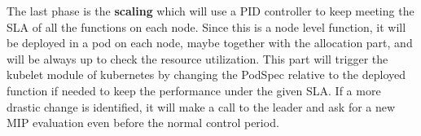 The last phase is the \textbf{scaling} which will use a PID controller to keep meeting the
SLA of all the functions on each node. Since this is a node level function, it will be
deployed in a pod on each node, maybe together with the allocation part, and will be always
up to check the resource utilization. This part will trigger the kubelet module of kubernetes
by changing the PodSpec relative to the deployed function if needed to keep the performance
under the given SLA. If a more drastic change is identified, it will make a call to the 
leader and ask for a new MIP evaluation even before the normal control period. 


